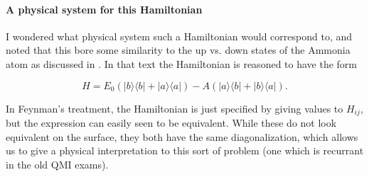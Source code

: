 {\paragraph{A physical system for this Hamiltonian}

I wondered what physical system such a Hamiltonian would correspond to, and noted that this bore some similarity to the up vs. down states of the Ammonia atom as discussed in \citep{feynman1963flp}.  In that text the Hamiltonian is reasoned to have the form

\begin{equation}\label{eqn:qmIexamPractice2008Dec:2:180}
H = E_0 ( {\lvert {b} \rangle}{\langle {b} \rvert}+ {\lvert {a} \rangle}{\langle {a} \rvert})- A( {\lvert {a} \rangle}{\langle {b} \rvert}+ {\lvert {b} \rangle}{\langle {a} \rvert}).
\end{equation}

In Feynman's treatment, the Hamiltonian is just specified by giving values to \(H_{ij}\), but the expression can easily seen to be equivalent.  While these do not look equivalent on the surface, they both have the same diagonalization, which allows us to give a physical interpretation to this sort of problem (one which is recurrant in the old QMI exams).
} %
